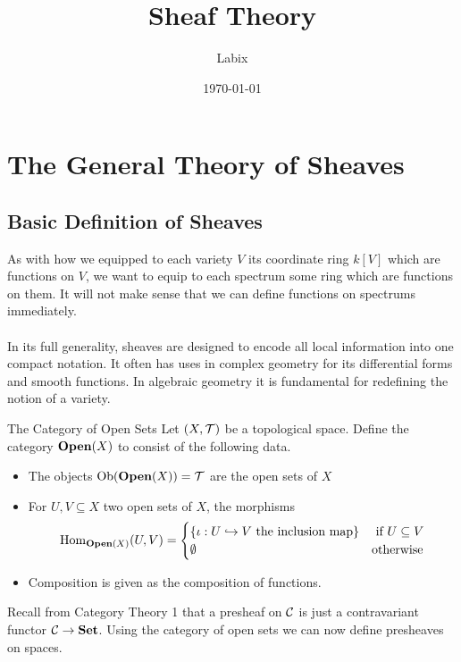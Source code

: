\documentclass[a4paper]{article}
\title{Sheaf Theory}
\author{Labix}
\date{\today}
\begin{document}
\maketitle
\begin{abstract}
\end{abstract}
\pagebreak
\tableofcontents
\pagebreak

\section{The General Theory of Sheaves}
\subsection{Basic Definition of Sheaves}
As with how we equipped to each variety $V$ its coordinate ring $k[V]$ which are functions on $V$, we want to equip to each spectrum some ring which are functions on them. It will not make sense that we can define functions on spectrums immediately. \\~\\

In its full generality, sheaves are designed to encode all local information into one compact notation. It often has uses in complex geometry for its differential forms and smooth functions. In algebraic geometry it is fundamental for redefining the notion of a variety. 

\begin{defn}{The Category of Open Sets}{} Let $(X,\mathcal{T})$ be a topological space. Define the category $\bold{Open}(X)$ to consist of the following data. 
\begin{itemize}
\item The objects $\text{Ob}(\bold{Open}(X))=\mathcal{T}$ are the open sets of $X$
\item For $U,V\subseteq X$ two open sets of $X$, the morphisms $$\operatorname{Hom}_{\bold{Open}(X)}(U,V)=\begin{cases}
\{\iota:U\hookrightarrow V\text{ the inclusion map}\} & \text{ if } U\subseteq V\\
\emptyset & \text{otherwise}
\end{cases}$$
\item Composition is given as the composition of functions. 
\end{itemize}
\end{defn}

Recall from Category Theory 1 that a presheaf on $\mathcal{C}$ is just a contravariant functor $\mathcal{C}\to\bold{Set}$. Using the category of open sets we can now define presheaves on spaces. 
\end{document}
